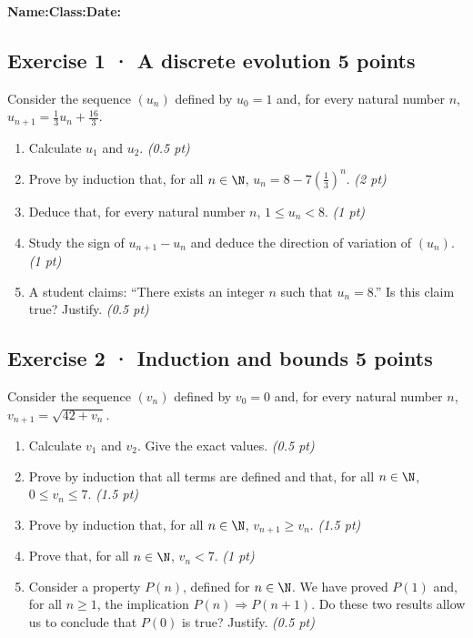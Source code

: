 \smallskip\textbf{Name:}\enspace\dotfill\quad\textbf{Class:}\enspace\dotfill\quad\textbf{Date:}\enspace\dotfill

\subsection*{Exercise 1 · A discrete evolution \hfill 5 points}Consider the sequence $(u_n)$ defined by $u_0=1$ and, for every natural number $n$, $u_{n+1}=\frac{1}{3}u_n+\frac{16}{3}$.

\begin{enumerate}

\item Calculate $u_1$ and $u_2$. \hfill\textit{(0.5 pt)}

\item Prove by induction that, for all $n\in\N$, $u_n=8-7\left(\frac{1}{3}\right)^n$. \hfill\textit{(2 pt)}

\item Deduce that, for every natural number $n$, $1\le u_n<8$. \hfill\textit{(1 pt)}

\item Study the sign of $u_{n+1}-u_n$ and deduce the direction of variation of $(u_n)$. \hfill\textit{(1 pt)}

\item A student claims: ``There exists an integer $n$ such that $u_n=8$.'' Is this claim true? Justify. \hfill\textit{(0.5 pt)}

\end{enumerate}

\subsection*{Exercise 2 · Induction and bounds \hfill 5 points}Consider the sequence $(v_n)$ defined by $v_0=0$ and, for every natural number $n$, $v_{n+1}=\sqrt{42+v_n}$.

\begin{enumerate}

\item Calculate $v_1$ and $v_2$. Give the exact values. \hfill\textit{(0.5 pt)}

\item Prove by induction that all terms are defined and that, for all $n\in\N$, $0\le v_n\le7$. \hfill\textit{(1.5 pt)}

\item Prove by induction that, for all $n\in\N$, $v_{n+1}\ge v_n$. \hfill\textit{(1.5 pt)}

\item Prove that, for all $n\in\N$, $v_n<7$. \hfill\textit{(1 pt)}

\item Consider a property $P(n)$, defined for $n\in\N$. We have proved $P(1)$ and, for all $n\ge1$, the implication $P(n)\Rightarrow P(n+1)$. Do these two results allow us to conclude that $P(0)$ is true? Justify. \hfill\textit{(0.5 pt)}

\end{enumerate}

